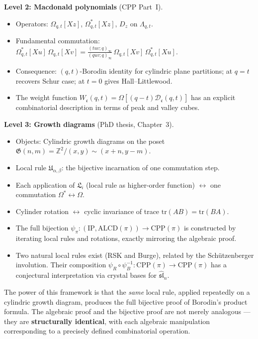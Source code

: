\documentclass[11pt]{article}
\newcommand{\Z}{\mathbb{Z}}
\newcommand{\La}{\Lambda}
\newcommand{\CPP}{\mathrm{CPP}}
\newcommand{\IP}{\mathrm{IP}}
\newcommand{\ALCD}{\mathrm{ALCD}}
\newcommand{\tr}{\mathrm{tr}}
\theoremstyle{plain}
\theoremstyle{definition}
\begin{document}
\medskip

\noindent\textbf{Level 2: Macdonald polynomials} (CPP Part~I).
\begin{itemize}
\item Operators: $\Omega_{q,t}[Xz]$, $\Omega^*_{q,t}[Xz]$, $D_z$ on $\La_{q,t}$.
\item Fundamental commutation:
$\Omega^*_{q,t}[Xu]\,\Omega_{q,t}[Xv] = \frac{(tuv;q)_\infty}{(quv;q)_\infty}\,\Omega_{q,t}[Xv]\,\Omega^*_{q,t}[Xu]$.
\item Consequence: $(q,t)$-Borodin identity for cylindric plane partitions; at $q=t$ recovers Schur case; at $t=0$ gives Hall--Littlewood.
\item The weight function $W_\mathfrak{c}(q,t) = \Omega[(q-t)\mathcal{D}_\mathfrak{c}(q,t)]$ has an explicit combinatorial description in terms of peak and valley cubes.
\end{itemize}

\medskip

\noindent\textbf{Level 3: Growth diagrams} (PhD thesis, Chapter~3).
\begin{itemize}
\item Objects: Cylindric growth diagrams on the poset $\mathfrak{G}(n,m) = \Z^2/(x,y)\sim(x+n,y-m)$.
\item Local rule $\mathfrak{U}_{\alpha,\beta}$: the bijective incarnation of one commutation step.
\item Each application of $\mathfrak{L}_i$ (local rule as higher-order function) $\longleftrightarrow$ one commutation $\Omega^* \leftrightarrow \Omega$.
\item Cylinder rotation $\longleftrightarrow$ cyclic invariance of trace $\tr(AB) = \tr(BA)$.
\item The full bijection $\psi_\pi : (\IP, \ALCD(\pi)) \to \CPP(\pi)$ is constructed by iterating local rules and rotations, exactly mirroring the algebraic proof.
\item Two natural local rules exist (RSK and Burge), related by the Sch\"utzenberger involution. Their composition $\psi_R \circ \psi_B^{-1} : \CPP(\pi) \to \CPP(\pi)$ has a conjectural interpretation via crystal bases for $\widehat{\mathfrak{sl}}_n$.
\end{itemize}

\medskip

The power of this framework is that the \emph{same} local rule, applied repeatedly on a cylindric growth diagram, produces the full bijective proof of Borodin's product formula. The algebraic proof and the bijective proof are not merely analogous --- they are \textbf{structurally identical}, with each algebraic manipulation corresponding to a precisely defined combinatorial operation.
\end{document}
